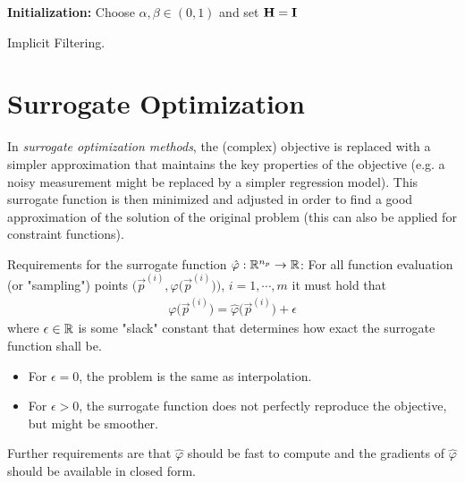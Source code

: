 			\begin{algorithm}  \DontPrintSemicolon
				\textbf{Initialization:} Choose \( \alpha, \beta \in (0, 1) \) and set \( \boldsymbol{\mathrm{H}} = \boldsymbol{\mathrm{I}} \) \;
				
				\caption{Implicit Filtering.}
				\label{alg:implicitFiltering}
			\end{algorithm}

	\section{Surrogate Optimization}
		In \emph{surrogate optimization methods}, the (complex) objective is replaced with a simpler approximation that maintains the key properties of the objective (e.g. a noisy measurement might be replaced by a simpler regression model). This surrogate function is then minimized and adjusted in order to find a good approximation of the solution of the original problem (this can also be applied for constraint functions).
		
		Requirements for the surrogate function \( \hat{\varphi} : \mathbb{R}^{n_p} \to \mathbb{R} \): For all function evaluation (or "sampling") points \( \Big( \vec{p}^{(i)}, \varphi\big(\vec{p}^{(i)}\big) \Big) \), \( i = 1, \cdots, m \) it must hold that
		\begin{align*}
			\varphi\big( \vec{p}^{(i)} \big) = \hat{\varphi}\big( \vec{p}^{(i)} \big) + \epsilon
		\end{align*}
		where \( \epsilon \in \mathbb{R} \) is some "slack" constant that determines how exact the surrogate function shall be.
		\begin{itemize}
			\item For \(\epsilon = 0\), the problem is the same as interpolation.
			\item For \(\epsilon > 0\), the surrogate function does not perfectly reproduce the objective, but might be smoother.
		\end{itemize}
		Further requirements are that \( \hat{\varphi} \) should be fast to compute and the gradients of \(\hat{\varphi}\) should be available in closed form.
		
